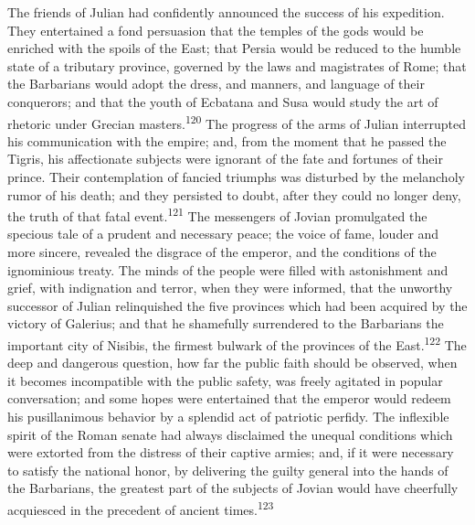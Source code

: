 
The friends of Julian had confidently announced the success of
his expedition. They entertained a fond persuasion that the
temples of the gods would be enriched with the spoils of the
East; that Persia would be reduced to the humble state of a
tributary province, governed by the laws and magistrates of Rome;
that the Barbarians would adopt the dress, and manners, and
language of their conquerors; and that the youth of Ecbatana and
Susa would study the art of rhetoric under Grecian masters.\textsuperscript{120}
The progress of the arms of Julian interrupted his communication
with the empire; and, from the moment that he passed the Tigris,
his affectionate subjects were ignorant of the fate and fortunes
of their prince. Their contemplation of fancied triumphs was
disturbed by the melancholy rumor of his death; and they
persisted to doubt, after they could no longer deny, the truth of
that fatal event.\textsuperscript{121} The messengers of Jovian promulgated the
specious tale of a prudent and necessary peace; the voice of
fame, louder and more sincere, revealed the disgrace of the
emperor, and the conditions of the ignominious treaty. The minds
of the people were filled with astonishment and grief, with
indignation and terror, when they were informed, that the
unworthy successor of Julian relinquished the five provinces
which had been acquired by the victory of Galerius; and that he
shamefully surrendered to the Barbarians the important city of
Nisibis, the firmest bulwark of the provinces of the East.\textsuperscript{122}
The deep and dangerous question, how far the public faith should
be observed, when it becomes incompatible with the public safety,
was freely agitated in popular conversation; and some hopes were
entertained that the emperor would redeem his pusillanimous
behavior by a splendid act of patriotic perfidy. The inflexible
spirit of the Roman senate had always disclaimed the unequal
conditions which were extorted from the distress of their captive
armies; and, if it were necessary to satisfy the national honor,
by delivering the guilty general into the hands of the
Barbarians, the greatest part of the subjects of Jovian would
have cheerfully acquiesced in the precedent of ancient times.\textsuperscript{123}


